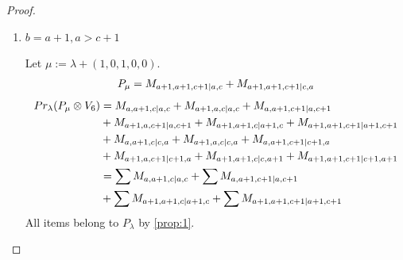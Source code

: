 \begin{proof}
\begin{enumerate}
\begin{enumerate}
        \item $b=a+1,a>c+1$ \par
        Let $\mu:=\lambda + (1,0,1,0,0) $.
        \begin{equation}\notag
          \begin{aligned}
            P_\mu = M_{a+1,a+1,c+1|a,c}
+ M_{a+1,a+1,c+1|c,a}
          \end{aligned}
        \end{equation}
        \begin{equation}\notag
          \begin{aligned}
            Pr_{\lambda}(P_\mu \otimes V_{6}) &=
M_{a,a+1,c|a,c}
+ M_{a+1,a,c|a,c}
+ M_{a,a+1,c+1|a,c+1}\\
                                              &
+ M_{a+1,a,c+1|a,c+1}
+ M_{a+1,a+1,c|a+1,c}
+ M_{a+1,a+1,c+1|a+1,c+1}\\
                                              &
+ M_{a,a+1,c|c,a}
+ M_{a+1,a,c|c,a}
+ M_{a,a+1,c+1|c+1,a}\\
                                              &
+ M_{a+1,a,c+1|c+1,a}
+ M_{a+1,a+1,c|c,a+1}
+ M_{a+1,a+1,c+1|c+1,a+1} \\
                                               &=
\sum M_{a,a+1,c|a,c}
+ \sum M_{a,a+1,c+1|a,c+1}\\
                                              &
+ \sum M_{a+1,a+1,c|a+1,c}
+ \sum M_{a+1,a+1,c+1|a+1,c+1}
          \end{aligned}
        \end{equation}
All items belong to $P_\lambda$ by \cref{prop:1}.


\end{enumerate}
\end{enumerate}
\end{proof}
